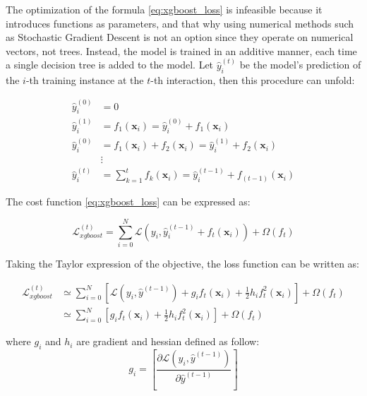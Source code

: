 The optimization of the formula \ref{eq:xgboost_loss} is infeasible because it introduces functions as parameters, and that why using numerical methods such as Stochastic Gradient Descent is not an option since they operate on numerical vectors, not trees.  Instead, the model is trained in an additive manner, each time a single decision tree is added to the model. Let $\hat{y}_{i}^{(t)}$ be the model's prediction of the $i$-th training instance at the $t$-th interaction, then this procedure can unfold: 

\begin{equation}
\begin{split}
    \hat{y}_{i}^{(0)} &= 0  \\
    \hat{y}_{i}^{(1)} &= f_{1}(\textbf{x}_i) = \hat{y}_{i}^{(0)} +  f_{1}(\textbf{x}_i)  \\
    \hat{y}_{i}^{(0)} &= f_{1}(\textbf{x}_i) + f_{2}(\textbf{x}_i) = \hat{y}_{i}^{(1)} +  f_{2}(\textbf{x}_i)   \\
    & \vdots   \\ 
    \hat{y}_{i}^{(t)} &=  \sum_{k=1}^{t}f_{k}(\textbf{x}_i) =  \hat{y}_{i}^{(t-1)} + f_{(t-1)}(\textbf{x}_i)
\end{split}
\end{equation}

The cost function \ref{eq:xgboost_loss} can be expressed as:

\begin{equation}
   \mathcal{L}_{xgboost}^{(t)} = \sum_{i=0}^{N}  \mathcal{L}(y_i,  \hat{y}_{i}^{(t-1)} + f_{t}(\mathbf{x}_i)) + \Omega(f_{t})
\end{equation}
 
Taking the Taylor expression of the objective, the loss function can be written as:

\begin{equation}
\begin{split}
   \mathcal{L}_{xgboost}^{(t)} &\simeq \sum_{i=0}^{N} \left[ 
   \mathcal{L}(y_i, \hat{y}^{(t-1)}) + g_i f_t(\mathbf{x}_i) + \frac{1}{2}h_if_{t}^{2}(\mathbf{x}_i)  
   \right] + \Omega(f_{t}) \\
    &\simeq \sum_{i=0}^{N} \left[ 
 g_i f_t(\mathbf{x}_i) + \frac{1}{2}h_if_{t}^{2}(\mathbf{x}_i)  
   \right] + \Omega(f_{t})
   \end{split}
   \label{eq:xgboost_taylor}
\end{equation}

where $g_i$ and $h_i$ are gradient and hessian defined as follow:  
\begin{equation}
    g_i = \left[\frac{\partial \mathcal{L}(y_{i},\hat{y}^{(t-1)})}{\partial \hat{y}^{(t-1)}} \right]
\end{equation}

